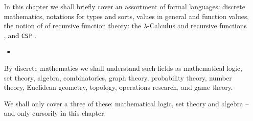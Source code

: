 

\label{chap2.tex.1}\label{chapter:The Mathematics}
\minitoc

\noindent
\begynd
\pind In this chapter we shall briefly cover an assortment of formal
languages:
\begynd
\pind discrete mathematics,
\pind notations for types and sorts, values in general and function values,
\pind the notion of of recursive function theory: the
      $\lambda$-Calculus \cite{Chu51,Barendregt91} and recursive
      functions \cite{Kleene52,Kleene67,Rogers67}, and 
\pind \texttt{CSP} \citecsp.
\afslut
\afslut

\begin{itemize}
\item[] \centerline{}
\end{itemize}


\label{chap2.tex.Discrete Mathematics}

By discrete mathematics we shall understand such fields as
\begynd
\pind mathematical logic, %
\pind set theory, %
\pind   algebra, %
\pind   combinatorics, %
\pind   graph theory, %
\pind   probability theory, %
\pind   number theory, %
\pind   Euclidean geometry, %
\pind   topology, %
\pind   operations research, and %
\pind   game theory. %
\afslut
  
We shall only cover a three of these:  mathematical logic, set theory
and algebra -- and only cursorily in this chapter.

\label{Logic and Mathematical Logic}

\label{Classical Logic}

\tbw

\label{Mathematical Logic}

\tbw

\label{Model and Proof Theory}

\label{truth tables} %
\tbw


